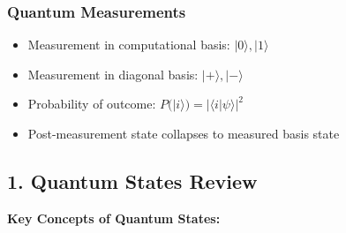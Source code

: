 \documentclass{article}
\begin{document}
\subsubsection{Quantum Measurements}
\begin{itemize}
    \item Measurement in computational basis: \(|0\rangle, |1\rangle\)
    \item Measurement in diagonal basis: \(|+\rangle, |-\rangle\)
    \item Probability of outcome: \(P(|i\rangle) = |\langle i|\psi\rangle|^2\)
    \item Post-measurement state collapses to measured basis state
\end{itemize}

\newpage
\subsection{1. Quantum States Review}
\textbf{Key Concepts of Quantum States:}
\end{document}
